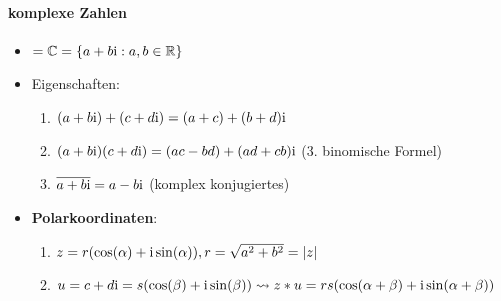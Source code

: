 \paragraph{komplexe Zahlen}
\begin{itemize}
  \item $= \mathbb{C} = \{ a+b\text{i} : a,b \in \mathbb{R} \}$
  \item Eigenschaften:
  \begin{enumerate}
    \item $(a+b\text{i})+(c+d\text{i}) = (a+c)+(b+d)\text{i}$
    \item $(a+b\text{i})(c+d\text{i}) = (ac-bd)+(ad+cb)\text{i}$ ($3$. binomische Formel)
    \item $\overline{a+b\text{i}}=a-b\text{i}$ (komplex konjugiertes)
  \end{enumerate}
  \item \textbf{Polarkoordinaten}:
  \begin{enumerate}
    \item $z=r(\cos(\alpha)+\text{i} \sin(\alpha)), r=\sqrt{a^2+b^2}=|z|$
    \item $u=c+d\text{i}=s(\cos(\beta)+\text{i} \sin(\beta))\\* \leadsto z*u=rs(\cos(\alpha+\beta)+\text{i} \sin(\alpha+\beta))$ 
  \end{enumerate}
\end{itemize}


